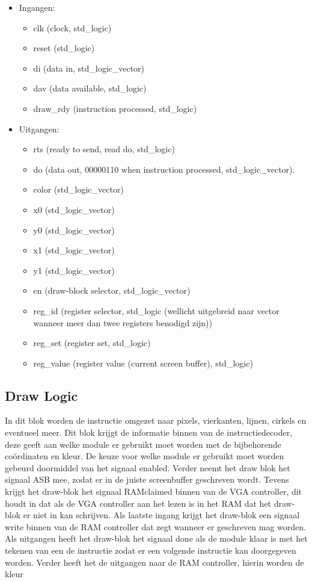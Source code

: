 \begin {itemize}
\item Ingangen:
\begin{itemize}
\item clk (clock, std_logic)
\item reset (std_logic)
\item di (data in, std_logic_vector)
\item dav (data available, std_logic)
\item draw_rdy (instruction processed, std_logic)
\end{itemize}

\item Uitgangen:
\begin{itemize}
\item rts (ready to send, read do, std_logic)
\item do (data out, 00000110 when instruction processed, std_logic_vector).
\item color (std_logic_vector)
\item x0 (std_logic_vector)
\item y0 (std_logic_vector)
\item x1 (std_logic_vector)
\item y1 (std_logic_vector)
\item en (draw-block selector, std_logic_vector)
\item reg_id (register selector, std_logic (wellicht uitgebreid naar vector wanneer meer dan twee registers benodigd zijn))
\item reg_set (register set, std_logic)
\item reg_value (register value (current screen buffer), std_logic)
\end{itemize}
\end{itemize}

\subsection{Draw Logic}
In dit blok worden de instructie omgezet naar pixels, vierkanten, lijnen, cirkels en eventueel meer. Dit blok krijgt de informatie binnen van de instructiedecoder, deze geeft aan welke module er gebruikt moet worden met de bijbehorende coördinaten en kleur.
De keuze voor welke module er gebruikt moet worden gebeurd doormiddel van het signaal enabled. Verder neemt het draw blok het signaal ASB mee, zodat er in de juiste screenbuffer geschreven wordt. Tevens krijgt het draw-blok het signaal RAMclaimed binnen van de VGA controller, dit houdt in dat als de VGA controller aan het lezen is in het RAM dat het draw-blok er niet in kan schrijven. Als laatste ingang krijgt het draw-blok een signaal write binnen van de RAM controller dat zegt wanneer er geschreven mag worden.
Als uitgangen heeft het draw-blok het signaal done als de module klaar is met het tekenen van een de instructie zodat er een volgende instructie kan doorgegeven worden. Verder heeft het de uitgangen naar de RAM controller, hierin worden de kleur 

